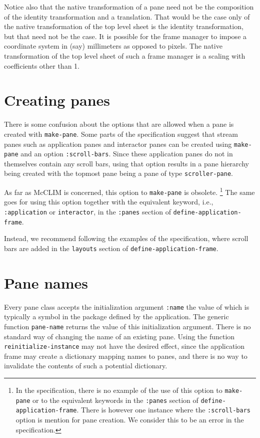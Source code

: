 Notice also that the native transformation of a pane need not be the
composition of the identity transformation and a translation.  That
would be the case only of the native transformation of the top level
sheet is the identity transformation, but that need not be the case.  It
is possible for the frame manager to impose a coordinate system in (say)
millimeters as opposed to pixels.  The native transformation of the top
level sheet of such a frame manager is a scaling with coefficients other
than 1.

\section{Creating panes}
\label{sec-panes-creating}

There is some confusion about the options that are allowed when a pane
is created with \texttt{make-pane}.  Some parts of the specification
suggest that stream panes such as application panes and interactor
panes can be created using \texttt{make-pane} and an option
\texttt{:scroll-bars}.  Since these application panes do not in
themselves contain any scroll bars, using that option results in a
pane hierarchy being created with the topmost pane being a pane of
type \texttt{scroller-pane}.

As far as McCLIM is concerned, this option to \texttt{make-pane} is
obsolete.%
\footnote{In the specification, there is no example of the use of this
  option to \texttt{make-pane} or to the equivalent keywords in the
  \texttt{:panes} section of \texttt{define-application-frame}.  There
  is however one instance where the \texttt{:scroll-bars} option is
  mention for pane creation.  We consider this to be an error in the
  specification.}
The same goes for using this option together with the equivalent
keyword, i.e., \texttt{:application} or \texttt{interactor}, in the
\texttt{:panes} section of \texttt{define-application-frame}.

Instead, we recommend following the examples of the specification,
where scroll bars are added in the \texttt{layouts} section of
\texttt{define-application-frame}.

\section{Pane names}

Every pane class accepts the initialization argument \texttt{:name}
the value of which is typically a symbol in the package defined by the
application.  The generic function \texttt{pane-name} returns the
value of this initialization argument.  There is no standard way of
changing the name of an existing pane.  Using the function
\texttt{reinitialize-instance} may not have the desired effect, since
the application frame may create a dictionary mapping names to panes,
and there is no way to invalidate the contents of such a potential
dictionary.

